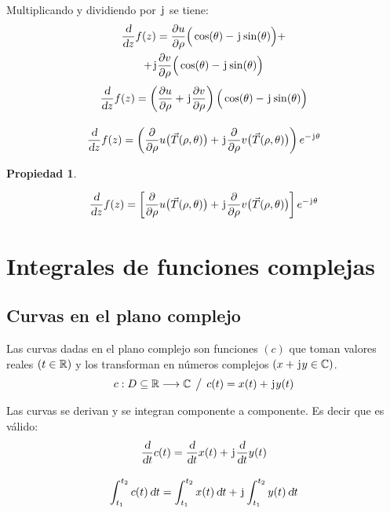 \documentclass[a5paper,12pt,twoside]{book}
\newtheorem{prop}{{Propiedad}}[chapter]
\begin{document}
Multiplicando y dividiendo por $\mkern2mu\mathrm{j}\mkern1mu$ se tiene:
\begin{multline*}
    \frac{\textsl{d}}{\textsl{d} z} f(z) = \frac{\partial u}{\partial \rho} \Big( \cos(\theta) - \mkern2mu\mathrm{j}\mkern1mu \sin(\theta) \Big) +
    \\
    + \mkern2mu\mathrm{j}\mkern1mu \frac{\partial v}{\partial \rho} \Big( \cos(\theta) - \mkern2mu\mathrm{j}\mkern1mu \sin(\theta) \Big)
\end{multline*}
\begin{gather*}
    \dfrac{\textsl{d}}{\textsl{d} z} f(z) = \left( \frac{\partial u}{\partial \rho} + \mkern2mu\mathrm{j}\mkern1mu \frac{\partial v}{\partial \rho} \right) \Big( \cos(\theta) - \mkern2mu\mathrm{j}\mkern1mu \sin(\theta) \Big)
    \\[1em]
    \frac{\textsl{d}}{\textsl{d} z} f(z) = \left( \frac{\partial}{\partial \rho} u \big( \Vec{T}(\rho,\theta) \big) + \mkern2mu\mathrm{j}\mkern1mu \frac{\partial}{\partial \rho} v \big( \Vec{T}(\rho,\theta) \big) \right) e^{-\mkern2mu\mathrm{j}\mkern1mu\theta}
\end{gather*}

\begin{mdframed}[style=PropertyFrame]
    \begin{prop}
    \end{prop}
    \begin{equation*}
        \frac{\textsl{d}}{\textsl{d} z} f(z) = \left[ \frac{\partial}{\partial \rho} u \big( \Vec{T}(\rho,\theta) \big) + \mkern2mu\mathrm{j}\mkern1mu \frac{\partial}{\partial \rho} v \big( \Vec{T}(\rho,\theta) \big) \right] e^{-\mkern2mu\mathrm{j}\mkern1mu\theta}
    \end{equation*}
\end{mdframed}


\chapter{Integrales de funciones complejas}


\section{Curvas en el plano complejo}

Las curvas dadas en el plano complejo son funciones $(c)$ que toman valores reales $(t\in\mathbb{R})$ y los transforman en números complejos $(x + \mkern2mu\mathrm{j}\mkern1mu y \in\mathbb{C})$.
\begin{equation*}
    c: D\subseteq \mathbb{R} \longrightarrow \mathbb{C} \hspace{1ex} \big/ \hspace{1ex} c(t) = x(t) + \mkern2mu\mathrm{j}\mkern1mu y(t)
\end{equation*}

Las curvas se derivan y se integran componente a componente.
Es decir que es válido:
\begin{gather*}
    \frac{\textsl{d}}{\textsl{d} t} c(t) = \frac{\textsl{d}}{\textsl{d} t} x(t) + \mkern2mu\mathrm{j}\mkern1mu \frac{\textsl{d}}{\textsl{d} t} y(t)
    \\[1em]
    \int_{t_1}^{t_2} c(t) \, \textsl{d} t = \int_{t_1}^{t_2} x(t) \, \textsl{d} t + \mkern2mu\mathrm{j}\mkern1mu \int_{t_1}^{t_2} y(t) \, \textsl{d} t
\end{gather*}
\end{document}
